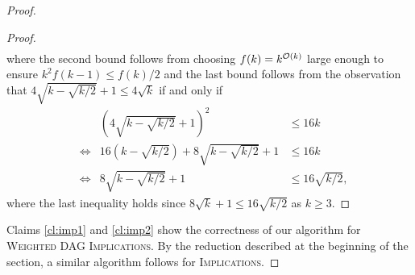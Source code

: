 \documentclass[10pt,a4paper]{article}
\theoremstyle{plain}
\newcommand{\Oh}{{\cal O}}
\newcommand{\Implication}{\textsc{Implications}\xspace}
\newcommand{\wDAGImplication}{\textsc{Weighted DAG Implications}\xspace}
\newcommand{\cqed}{}
\begin{document}
\begin{proof}
\begin{proof}
\begin{align*}
  \end{align*}
 where the second bound follows from choosing $f(k) = k^{\Oh(k)}$ large enough to ensure $k^2f(k-1) \le f(k)/2$ and 
 the last bound follows from the observation that $4\sqrt{k-\sqrt{k/2}} + 1\le 4\sqrt{k}$ if and only if 
   \begin{align*}
& &  \left(4\sqrt{k-\sqrt{k/2}} + 1\right)^2 & \le 16k\\
& \iff & 16(k-\sqrt{k/2}) + 8\sqrt{k-\sqrt{k/2}} + 1 & \le 16k\\
& \iff & 8\sqrt{k-\sqrt{k/2}} + 1 & \le 16\sqrt{k/2},
  \end{align*}
  where the last inequality holds since $8\sqrt{k}+1 \le 16\sqrt{k/2}$ as $k\ge 3$.
  \cqed\end{proof}
Claims \ref{cl:imp1} and \ref{cl:imp2} show the correctness of our algorithm for \wDAGImplication. By the reduction described at the beginning of the section, a similar algorithm follows for \Implication.
\end{proof}
\end{document}
